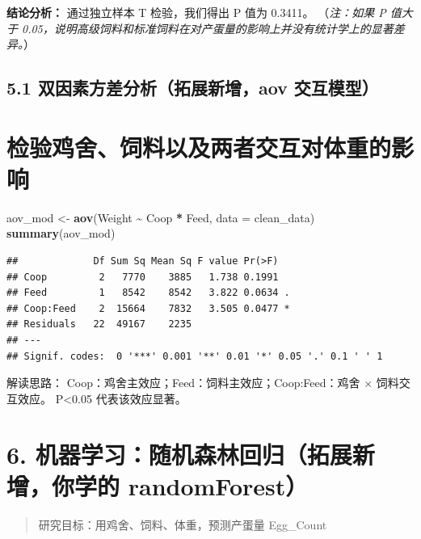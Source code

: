 \documentclass[
]{article}
\newenvironment{Shaded}{\begin{snugshade}}{\end{snugshade}}
\newcommand{\AttributeTok}[1]{\textcolor[rgb]{0.13,0.29,0.53}{#1}}
\newcommand{\FunctionTok}[1]{\textcolor[rgb]{0.13,0.29,0.53}{\textbf{#1}}}
\newcommand{\NormalTok}[1]{#1}
\newcommand{\OtherTok}[1]{\textcolor[rgb]{0.56,0.35,0.01}{#1}}
\newcommand{\SpecialCharTok}[1]{\textcolor[rgb]{0.81,0.36,0.00}{\textbf{#1}}}
\begin{document}
\textbf{结论分析：} 通过独立样本 T 检验，我们得出 P 值为 0.3411。
（\emph{注：如果 P 值大于
0.05，说明高级饲料和标准饲料在对产蛋量的影响上并没有统计学上的显著差异。}）

\subsection{5.1 双因素方差分析（拓展新增，aov
交互模型）}\label{ux53ccux56e0ux7d20ux65b9ux5deeux5206ux6790ux62d3ux5c55ux65b0ux589eaov-ux4ea4ux4e92ux6a21ux578b}

\section{检验鸡舍、饲料以及两者交互对体重的影响}\label{ux68c0ux9a8cux9e21ux820dux9972ux6599ux4ee5ux53caux4e24ux8005ux4ea4ux4e92ux5bf9ux4f53ux91cdux7684ux5f71ux54cd}

\begin{Shaded}
\begin{Highlighting}[]
\NormalTok{aov\_mod }\OtherTok{\textless{}{-}} \FunctionTok{aov}\NormalTok{(Weight }\SpecialCharTok{\textasciitilde{}}\NormalTok{ Coop }\SpecialCharTok{*}\NormalTok{ Feed, }\AttributeTok{data =}\NormalTok{ clean\_data)}
\FunctionTok{summary}\NormalTok{(aov\_mod)}
\end{Highlighting}
\end{Shaded}

\begin{verbatim}
##             Df Sum Sq Mean Sq F value Pr(>F)  
## Coop         2   7770    3885   1.738 0.1991  
## Feed         1   8542    8542   3.822 0.0634 .
## Coop:Feed    2  15664    7832   3.505 0.0477 *
## Residuals   22  49167    2235                 
## ---
## Signif. codes:  0 '***' 0.001 '**' 0.01 '*' 0.05 '.' 0.1 ' ' 1
\end{verbatim}

解读思路： Coop：鸡舍主效应；Feed：饲料主效应；Coop:Feed：鸡舍 ×
饲料交互效应。 P\textless0.05 代表该效应显著。

\section{6. 机器学习：随机森林回归（拓展新增，你学的
randomForest）}\label{ux673aux5668ux5b66ux4e60ux968fux673aux68eeux6797ux56deux5f52ux62d3ux5c55ux65b0ux589eux4f60ux5b66ux7684-randomforest}

\begin{quote}
研究目标：用鸡舍、饲料、体重，预测产蛋量 Egg\_Count
\end{quote}
\end{document}

